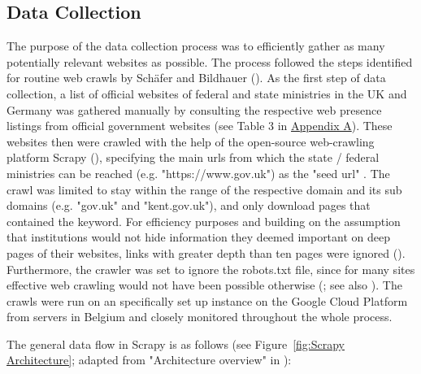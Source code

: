 \subsection{Data Collection}
The purpose of the data collection process was to efficiently gather as many potentially relevant websites as possible. The process followed the steps identified for routine web crawls by Schäfer and Bildhauer (\cite*{Schafer2012}).  As the first step of data collection, a list of official websites of federal and state ministries in the UK and Germany was gathered manually by consulting the respective web presence listings from official government websites (see Table 3 in \hyperref[Appendix A]{Appendix A}). These websites then were crawled with the help of the open-source web-crawling platform Scrapy (\cite{Kouzis-Loukas2016}), specifying the main urls from which the state / federal ministries can be reached (e.g. "https://www.gov.uk") as the "seed url" \parencite[p. 115]{Barbaresi2015}. The crawl was limited to stay within the range of the respective domain and its sub domains (e.g. "gov.uk" and "kent.gov.uk"), and only download pages that contained the keyword. For efficiency purposes and building on the assumption that institutions would not hide information they deemed important on deep pages of their websites, links with greater depth than ten pages were ignored (\cite{Scrapy2018, Wang2019}). Furthermore, the crawler was set to ignore the robots.txt file, since for many sites effective web crawling would not have been possible otherwise (\cite{Sun2007}; see also \cite[p. 125]{Barbaresi2015}). The crawls were run on an specifically set up instance on the Google Cloud Platform from servers in Belgium and closely monitored throughout the whole process.\par
The general data flow in Scrapy is as follows (see Figure~\ref{fig:Scrapy Architecture}; adapted from "Architecture overview" in \cite{Scrapy2018}):
